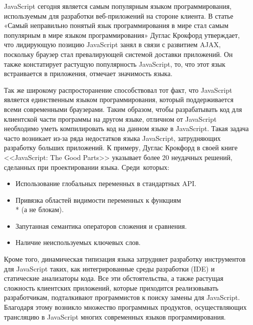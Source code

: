 \startprefacepage


JavaScript сегодня является самым популярным языком программирования, используемым для разработки веб-приложений на стороне клиента\cite{JsUsage, LangUsage}. В статье «Самый неправильно понятый язык программирования в мире стал самым популярным в мире языком программирования»\cite{MostPopLang} Дуглас Крокфорд утверждает, что лидирующую позицию JavaScript занял в связи с развитием AJAX, поскольку браузер стал превалирующей системой доставки приложений. Он также констатирует растущую популярность JavaScript, то, что этот язык встраивается в приложения, отмечает значимость языка.

Так же широкому распросторанение способствовал тот факт, что JavaScript является единственным языком программирования, который поддерживается всеми современными браузерами. Таким образом, чтобы разрабатывать код для клиентской части программы на другом языке, отличном от JavaScript необходимо уметь компилировать код на данном языке  в JavaScript. Такая задача часто возникает из-за ряда недостатков языка JavaScript, затрудняющих разработку больших приложений. К примеру, Дуглас Крокфорд в своей книге <<JavaScript: The Good Parts>>\cite{GoodParts} указывает более 20 неудачных решений, сделанных при проектировании языка. Среди~которых:
\begin{itemize}
\item Использование глобальных переменных в стандартных API.
\item Привязка областей видимости переменных к функциям\\* (а не блокам).
\item Запутанная семантика операторов сложения и сравнения.
\item Наличие неиспользуемых ключевых слов.
\end{itemize} 

Кроме того, динамическая типизация языка затрудняет разработку инструментов для JavaScript таких, как интегрированные среды разработки (IDE) и статические анализаторы кода. Все эти обстоятельства, а также растущая сложность клиентских приложений, которые приходится реализовывать разработчикам, подталкивают программистов к поиску замены для JavaScript. Благодаря этому возникло множество программных продуктов, осуществляющих трансляцию в JavaScript многих современных языков программирования.\cite{AltJS}

